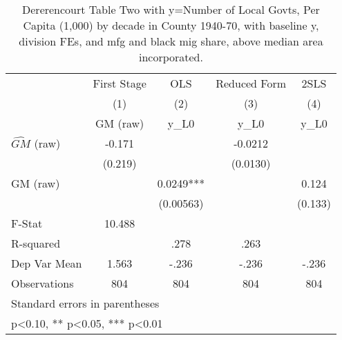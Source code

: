 \begin{table}[htbp]\centering
\def\sym#1{\ifmmode^{#1}\else\(^{#1}\)\fi}
\caption{Dererencourt Table Two with y=Number of Local Govts, Per Capita (1,000) by decade in County 1940-70, with baseline y, division FEs, and mfg and black mig share, above median area incorporated.}
\begin{tabular}{l*{4}{c}}
\toprule
                    & First Stage   &         OLS   &Reduced Form   &        2SLS   \\
                    &\multicolumn{1}{c}{(1)}&\multicolumn{1}{c}{(2)}&\multicolumn{1}{c}{(3)}&\multicolumn{1}{c}{(4)}\\
                    &\multicolumn{1}{c}{GM  (raw)}&\multicolumn{1}{c}{y\_L0}&\multicolumn{1}{c}{y\_L0}&\multicolumn{1}{c}{y\_L0}\\
\midrule
$\hat{GM}$ (raw)    &      -0.171   &               &     -0.0212   &               \\
                    &     (0.219)   &               &    (0.0130)   &               \\
\addlinespace
GM  (raw)           &               &      0.0249***&               &       0.124   \\
                    &               &   (0.00563)   &               &     (0.133)   \\
\midrule
F-Stat              &      10.488   &               &               &               \\
R-squared           &               &        .278   &        .263   &               \\
Dep Var Mean        &       1.563   &       -.236   &       -.236   &       -.236   \\
Observations        &         804   &         804   &         804   &         804   \\
\bottomrule
\multicolumn{5}{l}{\footnotesize Standard errors in parentheses}\\
\multicolumn{5}{l}{\footnotesize * p<0.10, ** p<0.05, *** p<0.01}\\
\end{tabular}
\end{table}
